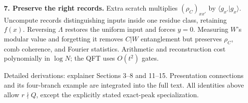 \textbf{7. Preserve the right records.}
Extra scratch multiplies \((\rho_C)_{xx'}\) by \(\langle g_{x'}|g_x\rangle\). Uncompute records distinguishing inputs inside one residue class, retaining \(f(x)\). Reversing \(\Lambda\) restores the uniform input and forces \(y=0\). Measuring \(W\)'s modular value and forgetting it removes \(C|W\) entanglement but preserves \(\rho_C\), comb coherence, and Fourier statistics. Arithmetic and reconstruction cost polynomially in \(\log N\); the QFT uses \(O(t^2)\) gates.
\par\vfill
{\fontsize{8.1}{9.3}\selectfont\color{accent}Detailed derivations: explainer Sections 3--8 and 11--15. Presentation connections and its four-branch example are integrated into the full text. All identities above allow \(r\nmid Q\), except the explicitly stated exact-peak specialization.}
\clearpage
\endgroup
\restoregeometry

